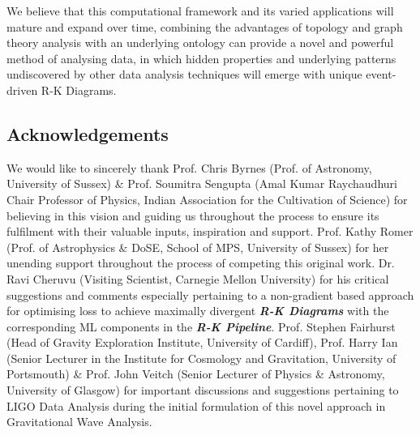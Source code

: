 We believe that this computational framework and its varied applications will mature and expand over time, combining the advantages of topology and graph theory analysis with an underlying ontology can provide a novel and powerful method of analysing data, in which hidden properties and underlying patterns undiscovered by other data analysis techniques will emerge with unique event-driven R-K Diagrams.

\subsection{Acknowledgements}

We would like to sincerely thank Prof. Chris Byrnes (Prof. of Astronomy, University of Sussex) \& Prof. Soumitra Sengupta (Amal Kumar Raychaudhuri Chair Professor of Physics, Indian Association for the Cultivation of Science) for  believing in this vision and guiding us throughout the process to ensure its fulfilment with their valuable inputs, inspiration and support. Prof. Kathy Romer (Prof. of Astrophysics \& DoSE, School of MPS, University of Sussex) for her unending support throughout the process of competing this original work. Dr. Ravi Cheruvu (Visiting Scientist, Carnegie Mellon University) for his critical suggestions and comments especially pertaining to a non-gradient based approach for optimising loss to achieve maximally divergent \textbf{\textit{R-K Diagrams}} with the corresponding ML components in the \textbf{\textit{R-K Pipeline}}. Prof. Stephen Fairhurst (Head of Gravity Exploration Institute, University of Cardiff), Prof. Harry Ian (Senior Lecturer in the Institute for Cosmology and Gravitation, University of Portsmouth) \& Prof. John Veitch (Senior Lecturer of Physics \& Astronomy, University of Glasgow) for important discussions and suggestions pertaining to LIGO Data Analysis during the initial formulation of this novel approach in Gravitational Wave Analysis.
